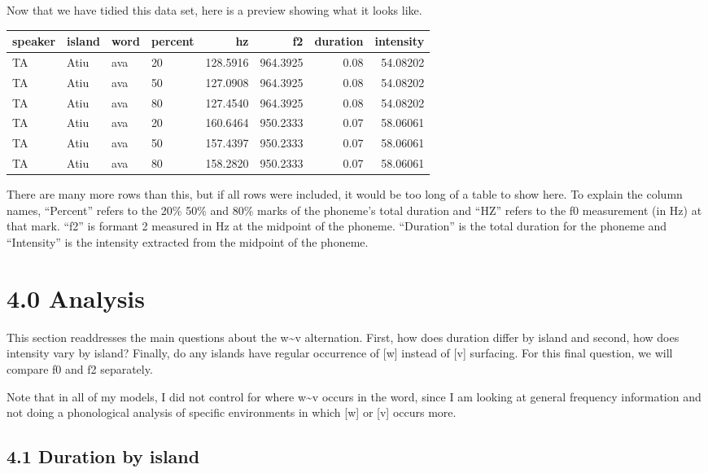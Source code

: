 \documentclass[
  ,man,floatsintext]{apa6}
\begin{document}
Now that we have tidied this data set, here is a preview showing what it looks like.

\begin{tabular}{l|l|l|l|r|r|r|r}
\hline
speaker & island & word & percent & hz & f2 & duration & intensity\\
\hline
TA & Atiu & ava & 20 & 128.5916 & 964.3925 & 0.08 & 54.08202\\
\hline
TA & Atiu & ava & 50 & 127.0908 & 964.3925 & 0.08 & 54.08202\\
\hline
TA & Atiu & ava & 80 & 127.4540 & 964.3925 & 0.08 & 54.08202\\
\hline
TA & Atiu & ava & 20 & 160.6464 & 950.2333 & 0.07 & 58.06061\\
\hline
TA & Atiu & ava & 50 & 157.4397 & 950.2333 & 0.07 & 58.06061\\
\hline
TA & Atiu & ava & 80 & 158.2820 & 950.2333 & 0.07 & 58.06061\\
\hline
\end{tabular}

There are many more rows than this, but if all rows were included, it would be too long of a table to show here. To explain the column names, ``Percent'' refers to the 20\% 50\% and 80\% marks of the phoneme's total duration and ``HZ'' refers to the f0 measurement (in Hz) at that mark. ``f2'' is formant 2 measured in Hz at the midpoint of the phoneme. ``Duration'' is the total duration for the phoneme and ``Intensity'' is the intensity extracted from the midpoint of the phoneme.

\section{4.0 Analysis}\label{analysis}

This section readdresses the main questions about the w\textasciitilde v alternation. First, how does duration differ by island and second, how does intensity vary by island? Finally, do any islands have regular occurrence of {[}w{]} instead of {[}v{]} surfacing. For this final question, we will compare f0 and f2 separately.

Note that in all of my models, I did not control for where w\textasciitilde v occurs in the word, since I am looking at general frequency information and not doing a phonological analysis of specific environments in which {[}w{]} or {[}v{]} occurs more.

\subsection{4.1 Duration by island}\label{duration-by-island}
\end{document}
